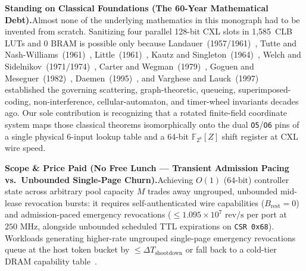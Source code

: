 \documentclass[11pt,letterpaper]{article}
\providecommand{\CoreClbLuts}{1,585}
\providecommand{\CorePhysicalLUTs}{\CoreClbLuts}
\theoremstyle{spectralthm}
\begin{document}
\noindent\textbf{Standing on Classical Foundations (The 60-Year Mathematical Debt).}\;Almost none of the underlying mathematics in this monograph had to be invented from scratch. Sanitizing four parallel 128-bit CXL slots in \CorePhysicalLUTs\ CLB LUTs and $0\text{~BRAM}$ is possible only because Landauer~(1957/1961)~\cite{1, landauer1957spatial}, Tutte and Nash-Williams~(1961)~\cite{tutte1961problem, nashwilliams1961edge}, Little~(1961)~\cite{little1961proof}, Kautz and Singleton~(1964)~\cite{kautz1964nonrandom}, Welch and Sidelnikov~(1971/1974)~\cite{welch1974lower}, Carter and Wegman~(1979)~\cite{carter1979universal}, Goguen and Meseguer~(1982)~\cite{goguen1982security}, Daemen~(1995)~\cite{daemen1995cipher}, and Varghese and Lauck~(1997)~\cite{varghese1997timing} established the governing scattering, graph-theoretic, queueing, superimposed-coding, non-interference, cellular-automaton, and timer-wheel invariants decades ago. Our sole contribution is recognizing that a rotated finite-field coordinate system maps those classical theorems isomorphically onto the dual \texttt{O5}/\texttt{O6} pins of a single physical 6-input lookup table and a 64-bit $\mathbb{F}_{2^8}[Z]$ shift register at CXL wire speed.

\noindent\textbf{Scope \& Price Paid (No Free Lunch --- Transient Admission Pacing vs.\ Unbounded Single-Page Churn).}\;Achieving $O(1)$ ($64\text{-bit}$) controller state across arbitrary pool capacity $M$ trades away ungrouped, unbounded mid-lease revocation bursts: it requires self-authenticated wire capabilities ($B_{\mathrm{rest}}=0$) and admission-paced emergency revocations ($\le 1.095 \times 10^7\text{~rev/s}$ per port at $250\text{~MHz}$, alongside unbounded scheduled TTL expirations on \texttt{CSR 0x68}). Workloads generating higher-rate ungrouped single-page emergency revocations queue at the host token bucket by $\le \Delta T_{\mathrm{shootdown}}$ or fall back to a cold-tier DRAM capability table~\cite{goswami2026spacecontrol}.
\end{document}
